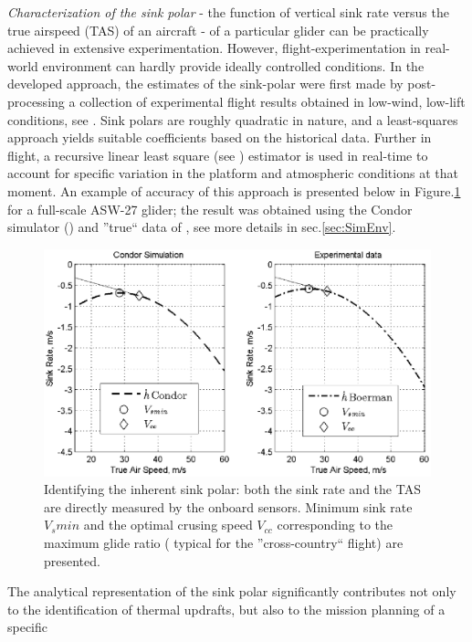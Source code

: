 \documentclass{ifacconf}
\begin{document}
\emph{Characterization of the sink polar} - the function of vertical sink rate versus the
true airspeed (TAS) of an aircraft - of a particular glider can be practically achieved
in extensive experimentation. However, flight-experimentation in real-world environment
can hardly provide ideally controlled conditions. In the developed approach, the
estimates of the sink-polar were first made by post-processing a collection of
experimental flight results obtained in low-wind, low-lift conditions, see
\cite{AKlass_JGCD:2012}. Sink polars are roughly quadratic in nature, and a least-squares
approach yields suitable coefficients based on the historical data. Further in flight, a
recursive linear least square (see \cite{Astrom:1995}) estimator is used in real-time to
account for specific variation in the platform and atmospheric conditions at that moment.
An example of accuracy of this approach is presented below in Figure.\ref{fig:SinkPolar}
for a full-scale ASW-27 glider; the result was obtained using the Condor simulator
(\cite{Condor:2013:Online}) and ''true`` data of \cite{Boermans:1994}, see more details
in sec.\ref{sec:SimEnv}.
\begin{figure}[thpb]
  \centering
  \includegraphics[scale=0.53]{Figures/Condor_Boermans_comparison.eps}
  \caption{Identifying the inherent sink polar: both the sink rate and the TAS are directly measured
  by the onboard sensors. Minimum sink rate $V_s min$ and the optimal crusing speed $V_{cc}$
  corresponding to the maximum glide ratio ( typical for the ''cross-country`` flight) are
  presented.}
  \label{fig:SinkPolar}
\end{figure}
The analytical representation of the sink polar significantly contributes not only to the
identification of thermal updrafts, but also to the mission planning of a specific
\end{document}
